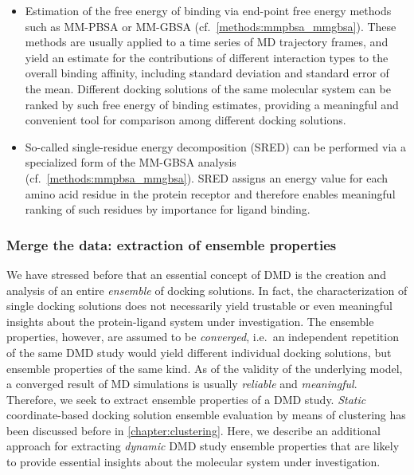 \begin{itemize}
\item Estimation of the free energy of binding via end-point free energy methods
such as MM-PBSA or MM-GBSA (cf.\ \cref{methods:mmpbsa_mmgbsa}). These methods
are usually applied to a time series of MD trajectory frames, and yield an
estimate for the contributions of different interaction types to the overall
binding affinity, including standard deviation and standard error of the mean.
Different docking solutions of the same molecular system can be ranked by such
free energy of binding estimates, providing a meaningful and convenient tool for
comparison among different docking solutions.

\item So-called single-residue energy decomposition (SRED) can be performed via
a specialized form of the MM-GBSA analysis (cf.\ \cref{methods:mmpbsa_mmgbsa}).
SRED assigns an energy value for each amino acid residue in the protein receptor
and therefore enables meaningful ranking of such residues by importance for
ligand binding.
\end{itemize}


\subsubsection{Merge the data: extraction of ensemble properties}

We have stressed before that an essential concept of DMD is the creation and
analysis of an entire \textit{ensemble} of docking solutions. In fact, the
characterization of single docking solutions does not necessarily yield
trustable or even meaningful insights about the protein-ligand system under
investigation. The ensemble properties, however, are assumed to be
\textit{converged}, i.e.\ an independent repetition of the same DMD study would
yield different individual docking solutions, but ensemble properties of the
same kind. As of the validity of the underlying model, a converged result of MD
simulations is usually \textit{reliable} and \textit{meaningful}. Therefore, we
seek to extract ensemble properties of a DMD study. \textit{Static}
coordinate-based docking solution ensemble evaluation by means of clustering has
been discussed before in \cref{chapter:clustering}. Here, we describe an
additional approach for extracting \textit{dynamic} DMD study ensemble
properties that are likely to provide essential insights about the molecular
system under investigation.

